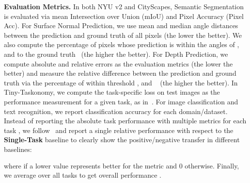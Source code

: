 \noindent\textbf{Evaluation Metrics.}\label{sec:evaluation_metrics}
In both NYU v2 and CityScapes, 
Semantic Segmentation is evaluated via mean Intersection over Union (mIoU) and Pixel Accuracy (Pixel Acc). For Surface Normal Prediction, we use mean and median angle distances between the prediction and ground truth of all pixels (the lower the better). We also compute the percentage of pixels whose prediction is within the angles of ,  and  to the ground truth~\cite{eigen2015predicting} (the higher the better).
For Depth Prediction, we compute absolute and relative errors as the evaluation metrics (the
lower the better) and measure the relative difference between the prediction and ground truth via the percentage of  within threshold ,  and ~\cite{eigen2014depth}  (the higher the better).  In Tiny-Taskonomy,
we compute the task-specific loss on test images as the performance measurement for a given task, as in~\cite{zamir2018taskonomy,standley2019tasks}. For image classification and text recognition, we report classification accuracy for each domain/dataset. Instead of reporting the absolute task performance with multiple metrics for each task , we follow~\cite{maninis2019attentive} and report a single relative performance  with respect to the \textbf{Single-Task} baseline to clearly show the positive/negative transfer in different baselines:

where  if a lower value represents better for the metric  and 0 otherwise.
Finally, we average over all tasks to get overall performance .


